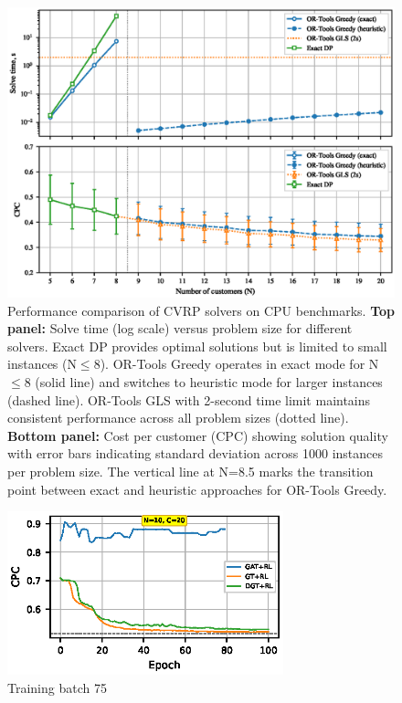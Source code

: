 \documentclass[a4paper,twoside]{article}
\begin{document}
\begin{figure}[t!]
\centering
   \includegraphics[width=150mm]{figures/benchmark.eps}
   \caption{Performance comparison of CVRP solvers on CPU benchmarks. 
       \textbf{Top panel:} Solve time (log scale) versus problem size for different solvers. 
       Exact DP provides optimal solutions but is limited to small instances (N$\leq$8). 
       OR-Tools Greedy operates in exact mode for N$\leq$8 (solid line) and switches to heuristic mode for larger instances (dashed line). 
       OR-Tools GLS with 2-second time limit maintains consistent performance across all problem sizes (dotted line). 
       \textbf{Bottom panel:} Cost per customer (CPC) showing solution quality with error bars indicating standard deviation across 1000 instances per problem size. 
       The vertical line at N=8.5 marks the transition point between exact and heuristic approaches for OR-Tools Greedy.}
\label{fig:benchmark}
\end{figure}






\begin{figure}[t!]
\centering
   \includegraphics[width=80mm]{figures/tiny_n10.eps}
   \caption{Training batch 75}
\label{fig:training_batch}
\end{figure}
\end{document}
